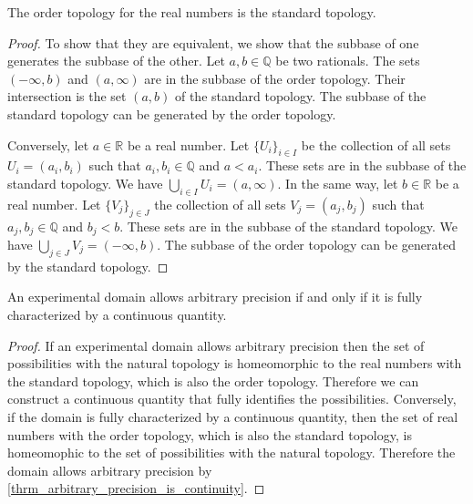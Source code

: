 \documentclass[11pt,letterpaper,fleqn]{memoir} %
\begin{document}
\begin{mathSection}
	\begin{prop}
		The order topology for the real numbers is the standard topology.
	\end{prop}
	\begin{proof}
		To show that they are equivalent, we show that the subbase of one generates the subbase of the other. Let $a,b \in \mathbb{Q}$ be two rationals. The sets $(-\infty, b)$ and $(a, \infty)$ are in the subbase of the order topology. Their intersection is the set $(a, b)$ of the standard topology. The subbase of the standard topology can be generated by the order topology.
		
		Conversely, let $a \in \mathbb{R}$ be a real number. Let $\{U_i\}_{i \in I}$ be the collection of all sets $U_i = (a_i, b_i)$ such that $a_i, b_i \in \mathbb{Q}$ and $a < a_i$. These sets are in the subbase of the standard topology. We have $\bigcup\limits_{i \in I} U_i = (a, \infty)$. In the same way, let $b \in \mathbb{R}$ be a real number. Let $\{V_j\}_{j \in J}$ the collection of all sets $V_j = (a_j, b_j)$ such that $a_j, b_j \in \mathbb{Q}$ and $b_j < b$. These sets are in the subbase of the standard topology. We have $\bigcup\limits_{j \in J} V_j = (-\infty, b)$. The subbase of the order topology can be generated by the standard topology.
	\end{proof}
	
	\begin{prop}
		An experimental domain allows arbitrary precision if and only if it is fully characterized by a continuous quantity.
	\end{prop}

	\begin{proof}
		If an experimental domain allows arbitrary precision then the set of possibilities with the natural topology is homeomorphic to the real numbers with the standard topology, which is also the order topology. Therefore we can construct a continuous quantity that fully identifies the possibilities. Conversely, if the domain is fully characterized by a continuous quantity, then the set of real numbers with the order topology, which is also the standard topology, is homeomophic to the set of possibilities with the natural topology. Therefore the domain allows arbitrary precision by \ref{thrm_arbitrary_precision_is_continuity}.
	\end{proof}	
\end{mathSection}
\end{document}
